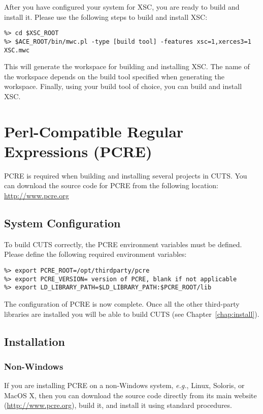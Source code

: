 After you have configured your system for XSC, you are ready to build and 
install it. Please use the following steps to build and install XSC:
\begin{lstlisting}
%> cd $XSC_ROOT
%> $ACE_ROOT/bin/mwc.pl -type [build tool] -features xsc=1,xerces3=1 XSC.mwc
\end{lstlisting}
This will generate the workspace for building and installing XSC. The name of 
the workspace depends on the build tool specified when generating the 
workspace. Finally, using your build tool of choice, you can build and 
install XSC.

\section{Perl-Compatible Regular Expressions (PCRE)}
\label{sec:thirdparty-pcre}

PCRE is required when building and installing several projects in CUTS. 
You can download the source code for PCRE from the following 
location: \url{http://www.pcre.org}

\subsection{System Configuration}

To build CUTS correctly, the PCRE environment variables must be defined. Please 
define the following required environment variables:
\begin{lstlisting}
%> export PCRE_ROOT=/opt/thirdparty/pcre
%> export PCRE_VERSION= version of PCRE, blank if not applicable
%> export LD_LIBRARY_PATH=$LD_LIBRARY_PATH:$PCRE_ROOT/lib
\end{lstlisting}
The configuration of PCRE is now complete. Once all the other
third-party libraries are installed you will be able to build CUTS
(see Chapter~\ref{chap:install}).

\subsection{Installation}

\subsubsection{Non-Windows}
 
If you are installing PCRE on a non-Windows system, \textit{e.g.}, Linux, 
Soloris, or MacOS X, then you can download the source code directly from its
main website (\url{http://www.pcre.org}), build it, and install it using
standard procedures.

